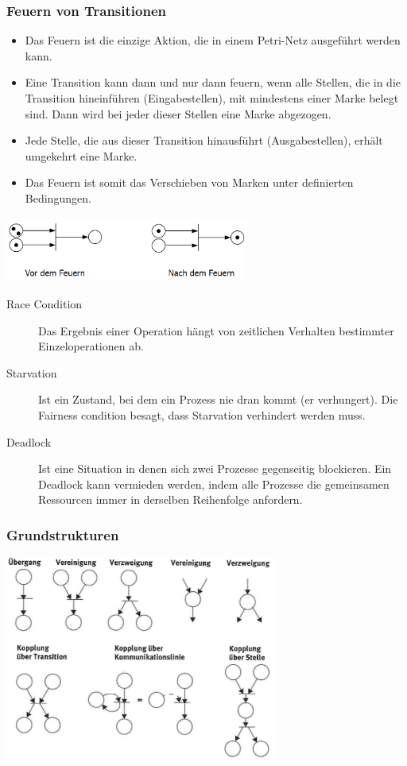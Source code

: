 \subsubsection{Feuern von Transitionen}
\begin{itemize}
\item Das Feuern ist die einzige Aktion, die in einem Petri-Netz ausgeführt werden kann.
\item Eine Transition kann dann und nur dann feuern, wenn alle Stellen, die in die Transition hineinführen (Eingabestellen), mit mindestens einer Marke belegt sind. Dann wird bei jeder dieser Stellen eine Marke abgezogen.
\item Jede Stelle, die aus
dieser Transition hinausführt (Ausgabestellen), erhält umgekehrt eine Marke.
\item Das Feuern ist somit das Verschieben von Marken unter definierten Bedingungen.
\end{itemize}
\includegraphics[width=8cm]{images/Concurrency/Petri1}

\begin{description}
  \item[Race Condition]  Das Ergebnis einer Operation hängt von zeitlichen Verhalten bestimmter Einzeloperationen ab.
  \item[Starvation]      Ist ein Zustand, bei dem ein Prozess nie dran kommt (er verhungert). Die Fairness condition besagt, dass Starvation verhindert werden muss.
  \item[Deadlock]        Ist eine Situation in denen sich zwei Prozesse gegenseitig blockieren. Ein Deadlock kann vermieden werden, indem alle Prozesse die gemeinsamen
Ressourcen immer in derselben Reihenfolge anfordern.
\end{description}

\subsubsection{Grundstrukturen}
\includegraphics[width=9cm]{images/Concurrency/Petri2}

